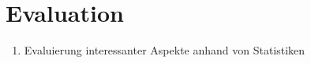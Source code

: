\section{Evaluation}

\begin{enumerate}
	\item Evaluierung interessanter Aspekte anhand von Statistiken
\end{enumerate}
